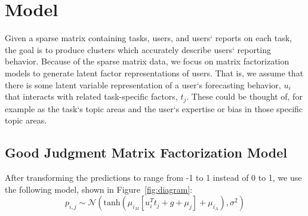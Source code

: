\documentclass{article}
\begin{document}
%


\section{Model}





Given a sparse matrix containing tasks, users, and users` reports on each task, the goal is to produce clusters which accurately describe users` reporting behavior. Because of the sparse matrix data, we focus on matrix factorization models to generate latent factor representations of users. That is, we assume that there is some latent variable representation of a user`s forecasting behavior, $u_i$ that interacts with related task-specific factors, $t_j$. These could be thought of, for example as the task`s topic areas and the user`s expertise or bias in those specific topic areas. 

\subsection{Good Judgment Matrix Factorization Model} After transforming the predictions to range from -1 to 1 instead of 0 to 1, we use the following model, shown in Figure~\ref{fig:diagram}:  
  $$
  p_{i,j} \sim \mathcal{N}(\textrm{tanh}\left( \mu_{i_M}\left[u_i^{T}t_j + g + \mu_j\right] + \mu_{i_A}\right), \sigma^2)
 $$
 
\end{document}
